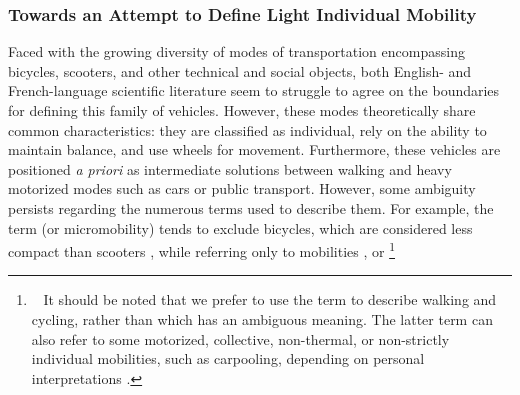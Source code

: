 \begin{refsegment}
\subsubsection*{Towards an Attempt to Define Light Individual Mobility
    \label{chap1:mobilite-individuelle-legere-definition}
    }

Faced with the growing diversity of modes of transportation encompassing bicycles, scooters, and other technical and social objects, both English- and French-language scientific literature seem to struggle to agree on the boundaries for defining this family of vehicles. However, these modes theoretically share common characteristics: they are classified as  individual, rely on the ability to maintain balance, and use wheels for movement. Furthermore, these vehicles are positioned \textsl{a priori} as intermediate solutions between walking and heavy motorized modes such as cars or public transport. However, some ambiguity persists regarding the numerous terms used to describe them. For example, the term  (or micromobility) tends to exclude bicycles, which are considered less compact than scooters \textcolor{blue}{\autocite[2, 4]{litman_new_2021}}, while  referring only to  mobilities \textcolor{blue}{\autocite{illich_energie_1973}}, or  \footnote{~
    It should be noted that we prefer to use the term  to describe walking and cycling, rather than  which has an ambiguous meaning. The latter term can also refer to some motorized, collective, non-thermal, or non-strictly individual mobilities, such as carpooling, depending on personal interpretations \textcolor{blue}{\autocite[240-241]{demailly_mobilite_2021}}.
}
\end{refsegment}
